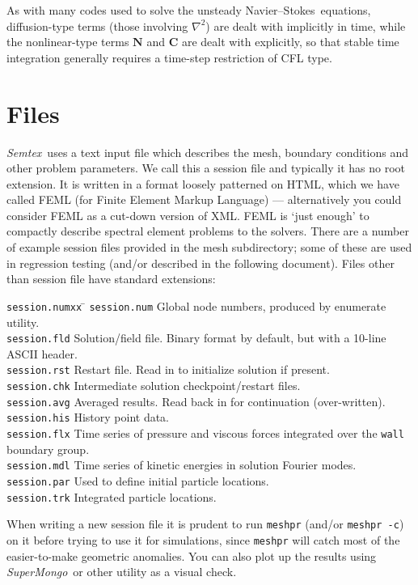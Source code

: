 \documentclass[11pt]{report}
\newcommand{\Semtex}{\emph{Semtex}} \newcommand{\Dog}{\emph{Dog}}
\newcommand{\SM}{\emph{SuperMongo}}
\newcommand\NavSto{Navier--Stokes}
\begin{document}
As with many codes used to solve the unsteady \NavSto\ equations,
diffusion-type terms (those involving $\nabla^2$) are dealt with
implicitly in time, while the nonlinear-type terms $\bm{N}$ and
$\bm{C}$ are dealt with explicitly, so that stable time integration
generally requires a time-step restriction of CFL type.

\section{Files}

\Semtex\ uses a text input file which describes the mesh, boundary
conditions and other problem parameters.  We call this a session file
and typically it has no root extension.  It is written in a format
loosely patterned on HTML, which we have called FEML (for Finite
Element Markup Language) --- alternatively you could consider FEML as
a cut-down version of XML.  FEML is `just enough' to compactly
describe spectral element problems to the solvers.  There are a number
of example session files provided in the mesh subdirectory; some of
these are used in regression testing (and/or described in the
following document).  Files other than session file have standard
extensions:
\begin{tabbing}
\texttt{session.numxx} \= \kill
\texttt{session.num}  \>
        Global node numbers, produced by enumerate utility.\\
\texttt{session.fld}  \>
        Solution/field file.  Binary format by default,
        but with a 10-line ASCII header.\\
\texttt{session.rst}  \>
        Restart file. Read in to initialize solution if present.\\
\texttt{session.chk}  \>
        Intermediate solution checkpoint/restart files.\\
\texttt{session.avg} \> Averaged results. Read back in for
        continuation (over-written).\\
\texttt{session.his} \> History point data.\\
\texttt{session.flx} \> Time series of pressure and viscous forces
        integrated over the \texttt{wall} boundary group.\\
\texttt{session.mdl} \> Time series of kinetic energies
        in solution Fourier modes.\\
\texttt{session.par} \> Used to define initial particle locations.\\
\texttt{session.trk} \> Integrated particle locations.\\
\end{tabbing}
When writing a new session file it is prudent to run \texttt{meshpr}
(and/or \texttt{meshpr -c}) on it before trying to use it for
simulations, since \texttt{meshpr} will catch most of the easier-to-make
geometric anomalies.  You can also plot up the results using \SM\ or
other utility as a visual check.
\end{document}
